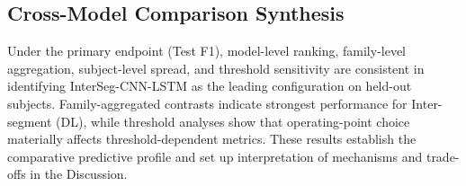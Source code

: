 \subsection{Cross-Model Comparison Synthesis}
\label{sec:cross_model_comparison_synthesis}
Under the primary endpoint (Test F1), model-level ranking, family-level aggregation, subject-level spread, and threshold sensitivity are consistent in identifying InterSeg-CNN-LSTM as the leading configuration on held-out subjects. Family-aggregated contrasts indicate strongest performance for Inter-segment (DL), while threshold analyses show that operating-point choice materially affects threshold-dependent metrics. These results establish the comparative predictive profile and set up interpretation of mechanisms and trade-offs in the Discussion.
